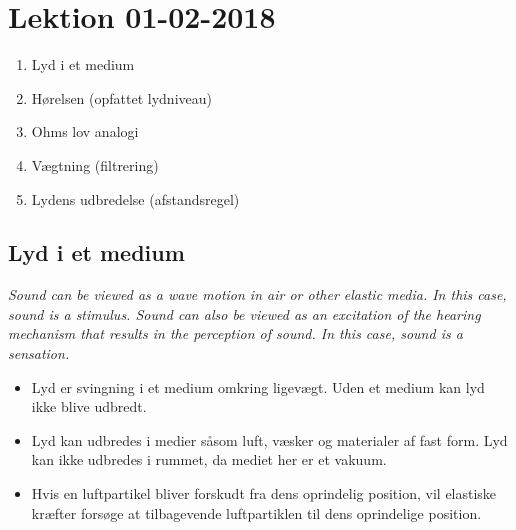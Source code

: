 \section{Lektion 01-02-2018}

\begin{enumerate}
	\item Lyd i et medium
	\item Hørelsen (opfattet lydniveau)
	\item Ohms lov analogi
	\item Vægtning (filtrering)
	\item Lydens udbredelse (afstandsregel)
	\end{enumerate}

\noindent{} \vspace{3mm}

\subsection{Lyd i et medium}

\textit{Sound can be viewed as a wave motion in air or other elastic media. In this case,	sound is a stimulus. Sound can also be viewed as an excitation of the hearing	mechanism that results in the perception of sound. In this case, sound is a sensation.}
\begin{itemize}
	\item Lyd er svingning i et medium omkring ligevægt. Uden et medium kan lyd ikke blive udbredt. 
	\item Lyd kan udbredes i medier såsom luft, væsker og materialer af fast form. Lyd kan ikke udbredes i rummet, da mediet her er et vakuum. 
	\item Hvis en luftpartikel bliver forskudt fra dens oprindelig position, vil elastiske kræfter forsøge at tilbagevende luftpartiklen til dens oprindelige position.
\end{itemize}

